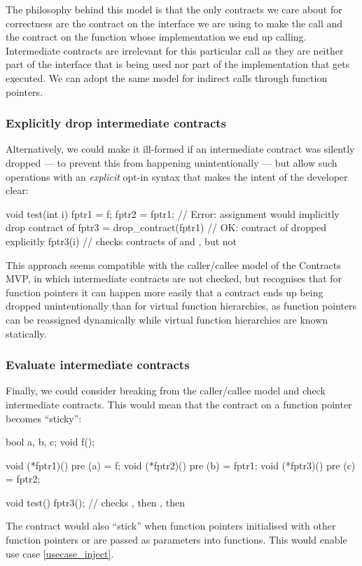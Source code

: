 The philosophy behind this model is that the only contracts we care about for correctness are the contract on the interface we are using to make the call and the contract on the function whose implementation we end up calling. Intermediate contracts are irrelevant for this particular call as they are neither part of the  interface that is being used nor part of the implementation that gets executed. We can adopt the same model for indirect calls through function pointers.


\subsubsection{Explicitly drop intermediate contracts}
\label{explicitdrop}

Alternatively, we could make it ill-formed if an intermediate contract was silently dropped --- to prevent this from happening unintentionally --- but allow such operations with an \emph{explicit} opt-in syntax that makes the intent of the developer clear:
\begin{codeblock}
void test(int i) {
  fptr1 = f;
  fptr2 = fptr1;                // Error: assignment would implicitly drop contract of 
  fptr3 = drop_contract(fptr1)  // OK: contract of  dropped explicitly
  fptr3(i)                      // checks contracts of  and , but not 
}
\end{codeblock}
This approach seems compatible with the caller/callee model of the Contracts MVP, in which intermediate contracts are not checked, but recognises that for function pointers it can happen more easily that a contract ends up being dropped unintentionally than for virtual function hierarchies, as function pointers can be reassigned dynamically while virtual function hierarchies are known statically.


\subsubsection{Evaluate intermediate contracts}
\label{sticky}

Finally, we could consider breaking from the caller/callee model and check intermediate contracts. This would mean that the contract on a function pointer becomes ``sticky'':
\begin{codeblock}
bool a, b, c;
void f();

void (*fptr1)() pre (a) = f;
void (*fptr2)() pre (b) = fptr1;
void (*fptr3)() pre (c) = fptr2;

void test() {
  fptr3();  // checks , then , then 
}
\end{codeblock}
The contract would also ``stick'' when function pointers initialised with other function pointers or are passed as parameters into functions. This would enable use case \ref{usecase_inject}.

